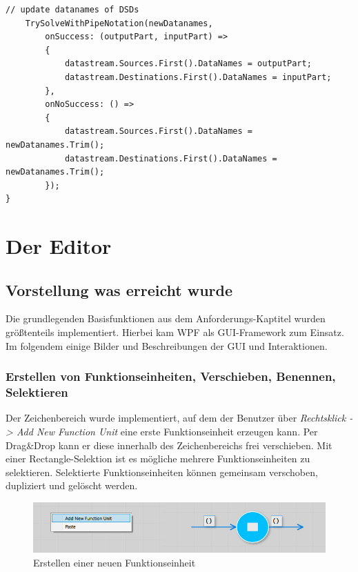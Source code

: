 \begin{enumerate}
\begin{lstlisting}[caption=\texttt{ChangeDatanames}-Methode]
	// update datanames of DSDs
	TrySolveWithPipeNotation(newDatanames,
		onSuccess: (outputPart, inputPart) =>
		{
			datastream.Sources.First().DataNames = outputPart;
			datastream.Destinations.First().DataNames = inputPart;
		},
		onNoSuccess: () =>
		{
			datastream.Sources.First().DataNames = newDatanames.Trim();
			datastream.Destinations.First().DataNames = newDatanames.Trim();
		});
}
\end{lstlisting}
	
\end{enumerate}



\section{Der Editor}

\subsection{Vorstellung was erreicht wurde}

Die grundlegenden Basisfunktionen aus dem Anforderungs-Kaptitel wurden größtenteils implementiert. Hierbei kam WPF als GUI-Framework zum Einsatz.
Im folgendem einige Bilder und Beschreibungen der GUI und Interaktionen.


\subsubsection{Erstellen von Funktionseinheiten, Verschieben, Benennen, Selektieren}

	Der Zeichenbereich wurde implementiert, auf dem der Benutzer über 
\textit{Rechtsklick -> Add New Function Unit} eine erste Funktionseinheit erzeugen
	kann. Per Drag\&Drop kann er diese innerhalb des Zeichenbereichs frei
	verschieben. Mit einer Rectangle-Selektion ist es mögliche mehrere
	Funktionseinheiten zu selektieren. Selektierte Funktionseinheiten können
	gemeinsam verschoben, dupliziert und gelöscht werden.
	
		\begin{figure}[H]
			\centering
			\includegraphics[width=1\linewidth]{./img/newFunctionUnit.jpg} 
			\caption{Erstellen einer neuen Funktionseinheit}
		\end{figure}
		
